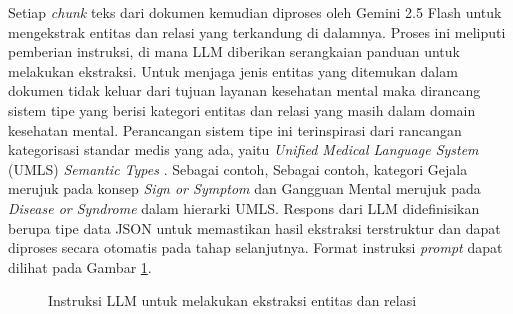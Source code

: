 Setiap \textit{chunk} teks dari dokumen kemudian diproses oleh Gemini 2.5 Flash untuk mengekstrak entitas dan relasi yang terkandung di dalamnya.
Proses ini meliputi pemberian instruksi, di mana LLM diberikan serangkaian panduan untuk melakukan ekstraksi.
Untuk menjaga jenis entitas yang ditemukan dalam dokumen tidak keluar dari tujuan layanan kesehatan mental maka dirancang sistem tipe yang berisi kategori entitas dan relasi yang masih dalam domain kesehatan mental.
Perancangan sistem tipe ini terinspirasi dari rancangan kategorisasi standar medis yang ada, yaitu \textit{Unified Medical Language System} (UMLS) \textit{Semantic Types} \cite{NIMHSemanticTypes}.
Sebagai contoh, Sebagai contoh, kategori Gejala merujuk pada konsep \textit{Sign or Symptom} dan Gangguan Mental merujuk pada \textit{Disease or Syndrome} dalam hierarki UMLS.
Respons dari LLM didefinisikan berupa tipe data JSON untuk memastikan hasil ekstraksi terstruktur dan dapat diproses secara otomatis pada tahap selanjutnya.
Format instruksi \textit{prompt} dapat dilihat pada Gambar \ref{fig:prompt-extraction-instruction}.

\begin{figure}[H]
	\centering
	\caption{
		Instruksi LLM untuk melakukan ekstraksi entitas dan relasi
	}
	\label{fig:prompt-extraction-instruction}
\end{figure}

